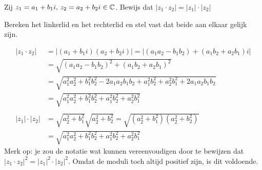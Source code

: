 \documentclass{ximera}
\begin{document}
\begin{xmuitweiding}
	\begin{exercise} Zij $z_1=a_1+b_1i,\, z_2=a_2+b_2i\in\mathbb{C}$. Bewijs dat 
		$|z_1\cdot z_2| = |z_1| \cdot |z_2|$
		\begin{hint} Bereken het linkerlid en het rechterlid en stel vast dat beide aan elkaar gelijk zijn.
		\end{hint}
		\begin{oplossing}
			\begin{align*}
			|z_1\cdot z_2| & = | (a_1+b_1i)(a_2+b_2i) | = |  (a_1a_2 - b_1b_2) + (a_1b_2+a_2b_1)i| \\
			& = \sqrt{ (a_1a_2 - b_1b_2)^2 + (a_1b_2+a_2b_1)^2}  \\
			&= \sqrt{ a_1^2a_2^2  + b_1^2b_2^2 -2a_1a_2b_1b_2 + a_1^2b_2^2 + a_2^2b_1^2 + 2a_1a_2b_1b_2}  \\
			&= \sqrt{ a_1^2a_2^2  + b_1^2b_2^2 + a_1^2b_2^2 + a_2^2b_1^2 }  \\
			\\
			|z_1|\cdot| z_2| & = \sqrt{a_2^2+b_1^2}\sqrt{a_2^2+b_2^2}= \sqrt{(a_2^2+b_1^2)(a_2^2+b_2^2)} \\
			&= \sqrt{ a_1^2a_2^2  + b_1^2b_2^2 + a_1^2b_2^2 + a_2^2b_1^2 }  
			\end{align*}
			Merk op: je zou de notatie wat kunnen vereenvoudigen door te bewijzen dat $|z_1\cdot z_2|^2 = |z_1|^2 \cdot |z_2|^2$. Omdat de moduli toch altijd positief zijn, is dit voldoende.
		\end{oplossing}
	\end{exercise}
\end{xmuitweiding}
\end{document}
